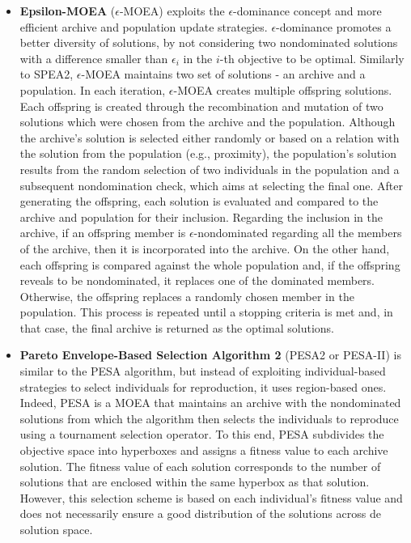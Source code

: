 \begin{itemize}
	\item \textbf{Epsilon-\ac{MOEA}} ($\epsilon$-MOEA) \cite{Deb2003EpsMOEA} exploits the $\epsilon$-dominance concept and more efficient archive and population update strategies. $\epsilon$-dominance promotes a better diversity of solutions, by not considering two nondominated solutions with a difference smaller than $\epsilon_i$ in the $i$-th objective to be optimal. Similarly to SPEA2, $\epsilon$-MOEA maintains two set of solutions - an archive and a population. In each iteration, $\epsilon$-MOEA creates multiple offspring solutions. Each offspring is created through the recombination and mutation of two solutions which were chosen from the archive and the population. Although the archive's solution is selected either randomly or based on a relation with the solution from the population (e.g., proximity), the population's solution results from the random selection of two individuals in the population and a subsequent nondomination check, which aims at selecting the final one. After generating the offspring, each solution is evaluated and compared to the archive and population for their inclusion. Regarding the inclusion in the archive, if an offspring member is $\epsilon$-nondominated regarding all the members of the archive, then it is incorporated into the archive. On the other hand, each offspring is compared against the whole population and, if the offspring reveals to be nondominated, it replaces one of the dominated members. Otherwise, the offspring replaces a randomly chosen member in the population. This process is repeated until a stopping criteria is met and, in that case, the final archive is returned as the optimal solutions.
	
	\item \textbf{Pareto Envelope-Based Selection Algorithm 2} (PESA2 or PESA-II) is similar to the PESA algorithm, but instead of exploiting individual-based strategies to select individuals for reproduction, it uses region-based ones. Indeed, PESA is a \ac{MOEA} that maintains an archive with the nondominated solutions from which the algorithm then selects the individuals to reproduce using a tournament selection operator. To this end, PESA subdivides the objective space into hyperboxes and assigns a fitness value to each archive solution. The fitness value of each solution corresponds to the number of solutions that are enclosed within the same hyperbox as that solution. However, this selection scheme is based on each individual's fitness value and does not necessarily ensure a good distribution of the solutions across de solution space.
	

\end{itemize}
